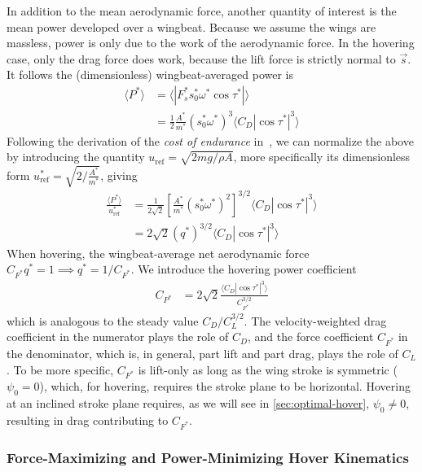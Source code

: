 \documentclass[11pt,letterpaper]{article}
\begin{document}
In addition to the mean aerodynamic force, another
quantity of interest is the mean power developed over
a wingbeat. Because we assume the wings are massless,
power is only due to the work of the aerodynamic force.
In the hovering case, only the drag force does work,
because the lift force is strictly normal to $\vec{s}$.
It follows the (dimensionless) wingbeat-averaged power is
\begin{align}
    \langle P^* \rangle &= \langle|F_s^* s_0^* \omega^* \cos\tau^*|\rangle \nonumber \\
        &= \frac12 \frac{A^*}{m^*} \left( s_0^* \omega^* \right)^3 \langle C_D |\cos \tau^*|^3 \rangle
\end{align}
Following the derivation of the \emph{cost of endurance}
in~\cite{wang2008}, we can normalize the above by introducing
the quantity $u_\text{ref} = \sqrt{2mg/\rho A}$, more specifically
its dimensionless form $u_\text{ref}^* = \sqrt{2/\frac{A^*}{m^*}}$, giving
\begin{align}
    \frac{\langle P^* \rangle}{u_\text{ref}^*} &= \frac{1}{2\sqrt{2}} \left[ \frac{A^*}{m^*} \left( s_0^* \omega^* \right)^2 \right]^{3/2} \langle C_D |\cos \tau^*|^3 \rangle \nonumber \\
                                               &= 2\sqrt{2} \left(q^*\right)^{3/2} \langle C_D |\cos \tau^*|^3 \rangle
\end{align}
When hovering, the wingbeat-average net aerodynamic force
$C_{F^*} q^* = 1 \implies q^* = 1/C_{F^*}$. We introduce the
hovering power coefficient
\begin{align}
    C_{P^*} &= 2\sqrt{2} \frac{\langle C_D |\cos \tau^*|^3 \rangle}{C_{F^*}^{3/2}}
\end{align}
which is analogous to the steady value  $C_D / C_L^{3/2}$.
The velocity-weighted drag coefficient in the numerator
plays the role of $C_D$, and the force coefficient $C_{F^*}$
in the denominator, which is, in general, part lift and part drag, plays
the role of $C_L$. To be more specific, $C_{F^*}$ is lift-only
as long as the wing stroke is symmetric ($\psi_0 = 0$), which, for hovering,
requires the stroke plane to be horizontal. Hovering at an inclined
stroke plane requires, as we will see in \autoref{sec:optimal-hover}, $\psi_0 \neq 0$,
resulting in drag contributing to $C_{F^*}$.

\subsubsection{Force-Maximizing and Power-Minimizing Hover Kinematics}\label{sec:optimal-hover}
\end{document}
